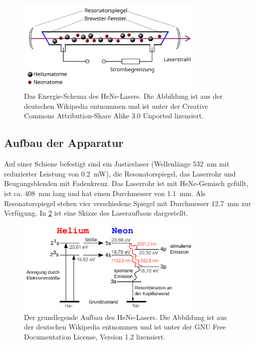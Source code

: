 \begin{figure}
  \centering
  \includegraphics[width=0.8\textwidth]{figures/HeNe-Laserschema}
  \caption{Das Energie-Schema des HeNe-Lasers.  Die Abbildung ist aus
    der deutschen Wikipedia entnommen \cite{wikipedia:laser} und ist
    unter der Creative Commons Attribution-Share Alike 3.0 Unported
    lizensiert.}
  \label{fig:hene-schema}
\end{figure}

\subsection{Aufbau der Apparatur}
Auf einer Schiene befestigt sind ein Justierlaser (Wellenlänge
\SI{532}{nm} mit reduzierter Leistung von \SI{0.2}{mW}), die
Resonatorspiegel, das Laserrohr und Beugungsblenden mit Fadenkreuz.  Das
Laserrohr ist mit HeNe-Gemisch gefüllt, ist ca. \SI{408}{mm} lang und
hat einen Durchmesser von \SI{1.1}{mm}.  Als Resonatorspiegel stehen
vier verschiedene Spiegel mit Durchmesser \SI{12.7}{mm} zur Verfügung.
In \cref{fig:laser-schema} ist eine Skizze des Laseraufbaus dargestellt.

\begin{figure}
  \centering
  \includegraphics[width=0.8\textwidth]{figures/HeNe-Laser-Energieschema}
  \caption{Der grundlegende Aufbau des HeNe-Lasers.  Die Abbildung ist
    aus der deutschen Wikipedia entnommen \cite{wikipedia:laser} und ist
    unter der GNU Free Documentation License, Version 1.2 lizensiert.}
  \label{fig:laser-schema}
\end{figure}

